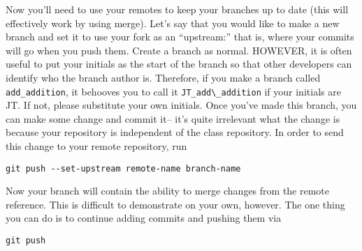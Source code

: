 \par{
Now you'll need to use your remotes to keep your branches up to date (this
will effectively work by using merge). Let's say that you would like to make a
new branch and set it to use your fork as an ``upstream:'' that is, where your
commits will go when you push them. Create a branch as normal. HOWEVER, it is
often useful to put your initials as the start of the branch so that other
developers can identify who the branch author is. Therefore, if you make a
branch called \verb+add_addition+, it behooves you to call it 
\verb+JT_add\_addition+
if your initials are JT. If not, please substitute your own initials.
Once you've made this branch, you can make some change and commit it-- it's
quite irrelevant what the change is because your repository is independent of
the class repository. In order to send this change to your remote repository,
run
}

\begin{verbatim}
git push --set-upstream remote-name branch-name
\end{verbatim}

\par{
Now your branch will contain the ability to merge changes from the remote
reference. This is difficult to demonstrate on your own, however. The one
thing you can do is to continue adding commits and pushing them via
}

\begin{verbatim}
git push
\end{verbatim}


